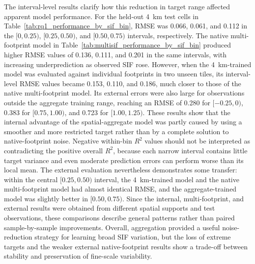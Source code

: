 The interval-level results clarify how this reduction in target range affected apparent model performance. For the held-out 4~km test cells in Table~\ref{tab:rq1_performance_by_sif_bin}, RMSE was 0.066, 0.061, and 0.112 in the $[0,0.25)$, $[0.25,0.50)$, and $[0.50,0.75)$ intervals, respectively. The native multi-footprint model in Table~\ref{tab:multisif_performance_by_sif_bin} produced higher RMSE values of 0.136, 0.111, and 0.201 in the same intervals, with increasing underprediction as observed SIF rose. However, when the 4~km-trained model was evaluated against individual footprints in two unseen tiles, its interval-level RMSE values became 0.153, 0.110, and 0.186, much closer to those of the native multi-footprint model. Its external errors were also large for observations outside the aggregate training range, reaching an RMSE of 0.280 for $[-0.25,0)$, 0.383 for $[0.75,1.00)$, and 0.723 for $[1.00,1.25)$. These results show that the internal advantage of the spatial-aggregate model was partly caused by using a smoother and more restricted target rather than by a complete solution to native-footprint noise. Negative within-bin $R^2$ values should not be interpreted as contradicting the positive overall $R^2$, because each narrow interval contains little target variance and even moderate prediction errors can perform worse than its local mean. The external evaluation nevertheless demonstrates some transfer: within the central $[0.25,0.50)$ interval, the 4~km-trained model and the native multi-footprint model had almost identical RMSE, and the aggregate-trained model was slightly better in $[0.50,0.75)$. Since the internal, multi-footprint, and external results were obtained from different spatial supports and test observations, these comparisons describe general patterns rather than paired sample-by-sample improvements. Overall, aggregation provided a useful noise-reduction strategy for learning broad SIF variation, but the loss of extreme targets and the weaker external native-footprint results show a trade-off between stability and preservation of fine-scale variability.

